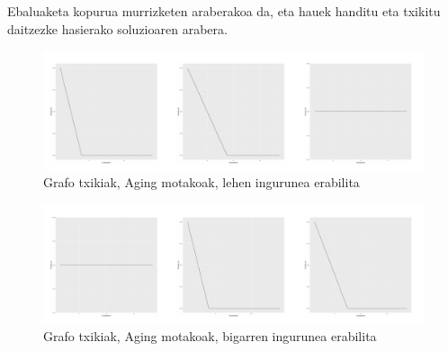 \documentclass[eu,gi]{ifirak}\usepackage[]{graphicx}\usepackage[]{color}
\makeatletter
\def\maxwidth{ %
  \ifdim\Gin@nat@width>\linewidth
    \linewidth
  \else
    \Gin@nat@width
  \fi
}
\newenvironment{knitrout}{}{} %
\makeatother
\begin{document}
Ebaluaketa kopurua murrizketen araberakoa da, eta hauek handitu eta txikitu daitzezke hasierako soluzioaren arabera.\\


\begin{center}	
\begin{knitrout}
\color{fgcolor}\begin{figure}[!h]
\includegraphics[width=\maxwidth]{figure/unnamed-chunk-1-1} \caption[Grafo txikiak, Aging motakoak, lehen ingurunea erabilita]{Grafo txikiak, Aging motakoak, lehen ingurunea erabilita}\label{fig:unnamed-chunk-1}
\end{figure}


\end{knitrout}
\end{center}

\begin{center}	
\begin{knitrout}
\color{fgcolor}\begin{figure}[!h]
\includegraphics[width=\maxwidth]{figure/unnamed-chunk-2-1} \caption[Grafo txikiak, Aging motakoak, bigarren ingurunea erabilita]{Grafo txikiak, Aging motakoak, bigarren ingurunea erabilita}\label{fig:unnamed-chunk-2}
\end{figure}


\end{knitrout}
\end{center}
\end{document}
